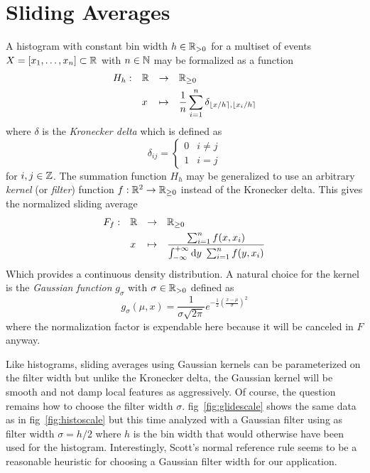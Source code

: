 \documentclass{graphstudy}
\begin{document}
\section{Sliding Averages}
\label{sec:gaussian}

A histogram with constant bin width \(h\in\RealsPos\) for a multiset of events
\(\Vec{X}=\multiset{x_1,\ldots,x_n}\subset\Reals\) with \(n\in\mathbb{N}\) may be formalized as a function
\begin{equation}
  \label{eq:histofunc}
  \begin{aligned}
    H_h:\quad &\Reals &\to\quad     &\RealsNN\\[\parskip]
              &x      &\mapsto\quad &\frac{1}{n} \sum_{i=1}^{n} \delta_{\nint{x/h},\nint{x_i/h}}
    \end{aligned}
\end{equation}
where \(\delta\) is the \emph{Kronecker delta} which is defined as
\begin{equation}
  \delta_{ij} = \begin{cases}0 &i\neq{}j\\1 &i=j\end{cases}
\end{equation}
for \(i,j\in\mathbb{Z}\).  The summation function \(H_h\) may be generalized to use an arbitrary \emph{kernel} (or
\emph{filter}) function \(f:\Reals^2\to\RealsNN\) instead of the Kronecker delta.  This gives the normalized sliding
average
\begin{equation}
  \label{eq:movavgfunc}
  \begin{aligned}
    F_f:\quad &\Reals &\to\quad     &\RealsNN\\[\parskip]
              &x      &\mapsto\quad &\frac{\sum_{i=1}^{n} f(x,x_i)}
                                        {\int_{-\infty}^{+\infty}\diff{y}\sum_{i=1}^{n} f(y,x_i)}
  \end{aligned}
\end{equation}
Which provides a continuous density distribution.  A natural choice for the kernel is the \emph{Gaussian
  function} \(g_\sigma\) with \(\sigma\in\RealsPos\) defined as
\begin{equation}
  \label{eq:gaussfilter}
  g_\sigma(\mu,x) = \frac{1}{\sigma\sqrt{2\pi}} e^{-\frac{1}{2}\left(\frac{x-\mu}{\sigma}\right)^2}
\end{equation}
where the normalization factor is expendable here because it will be canceled in \(F\) anyway.

Like histograms, sliding averages using Gaussian kernels can be parameterized on the filter width but unlike the
Kronecker delta, the Gaussian kernel will be smooth and not damp local features as aggressively.  Of course, the
question remains how to choose the filter width \(\sigma\).  \Acl{fig}~\ref{fig:glidescale} shows the same data as in
\Acl{fig}~\ref{fig:histoscale} but this time analyzed with a Gaussian filter using as filter width \(\sigma=h/2\) where
\(h\) is the bin width that would otherwise have been used for the histogram.  Interestingly, Scott's normal reference
rule seems to be a reasonable heuristic for choosing a Gaussian filter width for our application.
\end{document}
